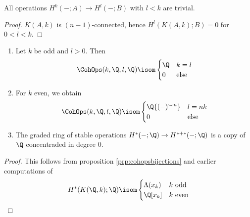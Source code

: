 \begin{corollary}
	All operations $H^k({{-}}; A) \to H^l({{-}}; B)$ with $l < k$ are trivial.
\end{corollary}
\begin{proof}
	$K(A, k)$ is $(n - 1)$-connected, hence $H^l(K(A, k); B) = 0$ for $0 < l < k$.
\end{proof}
\begin{corollary}
	\leavevmode
	\begin{enumerate}
		\item Let $k$ be odd and $l > 0$.
			Then
			\begin{equation*}
				\CohOps(k, \Q, l, \Q) \isom \begin{cases}
					\Q 	& k = l \\
					0 	& \text{else}
				\end{cases}
			\end{equation*}
		\item For $k$ even, we obtain
			\begin{equation*}
				\CohOps(k, \Q, l, \Q) \isom \begin{cases}
					\Q\{({{-}})^{\smile n}\} 	& l = n k \\
					0 							& \text{else}
				\end{cases}
			\end{equation*}
		\item The graded ring of stable operations $H^*({{-}}; \Q) \to H^{* + *}({{-}}; \Q)$ is a copy of $\Q$ concentraded in degree 0.
	\end{enumerate}
\end{corollary}
\begin{proof}
	This follows from proposition \ref{prp:cohopsbijections} and earlier computations of
	\begin{equation*}
		H^*(K(\Q, k); \Q) \isom \begin{cases}
			\Lambda(x_k) 	& k \text{ odd} \\
			\Q[x_k] 		& k \text{ even}
		\end{cases}
	\end{equation*}
\end{proof}

